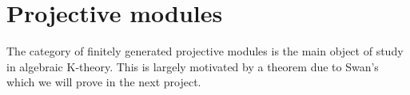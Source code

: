 \documentclass[12pt]{report}
\numberwithin{equation}{section}
\newcounter{dummy} \numberwithin{dummy}{section}
\newtheorem{definition}[dummy]{Definition}
\begin{document}
	
	\section{Projective modules}	
	The category of finitely generated projective modules is the main object of study in algebraic K-theory. This is largely motivated by a theorem due to Swan's which we will prove in the next project.
	
\end{document}
